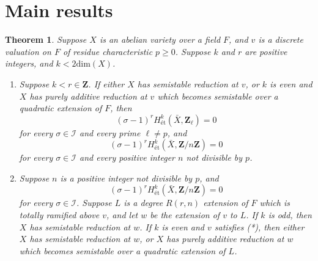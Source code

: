\documentclass{amsart}
\def\Z{{\mathbf Z}}
\def\I{{\mathcal I}}
\def\dim{\mathrm{dim}}
\newtheorem{thm}{Theorem}[section]
\theoremstyle{definition}
\begin{document}
\section{Main results}

\begin{thm}
\label{highercoh}
Suppose $X$ is an abelian variety over a field $F$, and $v$ is a discrete 
valuation on $F$ of residue characteristic $p \ge 0$.
Suppose $k$ and $r$ are positive integers, and
$k < 2\dim(X)$.
\begin{enumerate}
\item[{(i)}] Suppose $k<r\in\Z$.
If either $X$ has semistable reduction at $v$, 
or $k$ is even and 
$X$ has purely additive reduction at $v$ which becomes
semistable over a quadratic extension of $F$,
then 
$$(\sigma - 1)^{r}H^k_{\text{\'et}}({\bar X}, \Z_{\ell}) = 0$$ 
for every $\sigma \in \I$ and every prime $\ell \ne p$,
and
$$(\sigma - 1)^{r}H^k_{\text{\'et}}({\bar X}, \Z/n\Z) = 0$$ 
for every $\sigma \in \I$ and every positive integer $n$ not
divisible by $p$.
\item[{(ii)}] Suppose $n$ is a positive integer not divisible by
$p$, and 
$$(\sigma - 1)^{r}H^k_{\text{\'et}}({\bar X}, \Z/n\Z) = 0$$ 
for every $\sigma \in \I$. 
Suppose $L$ is a degree $R(r,n)$ extension of $F$ which is
totally ramified above $v$, and let $w$ be the extension of
$v$ to $L$.
If $k$ is odd, then $X$ has semistable reduction at $w$.
If $k$ is even and $v$ satisfies (*), 
then either $X$ has semistable reduction at $w$, or
$X$ has purely additive reduction at $w$ which becomes
semistable over a quadratic extension of $L$.
\end{enumerate}
\end{thm}
\end{document}
